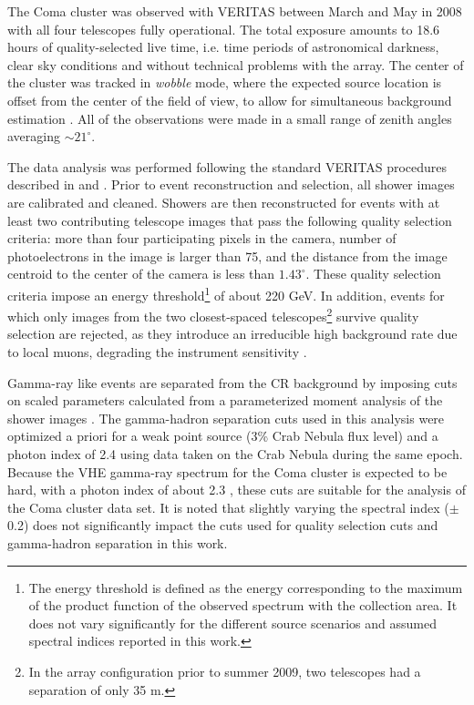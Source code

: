\documentclass[12pt,manuscript]{aastex}
\begin{document}
The Coma cluster was observed with VERITAS between March and May in 2008 with all four telescopes
fully operational. The total exposure amounts to 18.6 hours of quality-selected live time, i.e.
time periods of astronomical darkness, clear sky conditions and without technical problems with the
array. The center of the cluster was tracked in \emph{wobble} mode, where the expected source
location is offset from the center of the field of view, to allow for simultaneous background
estimation \citep{article:Fomin_etal:1994}. All of the observations were made in a small range of
zenith angles averaging $\sim 21^{\circ}$.

The data analysis was performed following the standard VERITAS procedures described in
\citet{inproc:Cogan_etal:2007} and \citet{inproc:Daniel_etal:2007}. Prior to event reconstruction
and selection, all shower images are calibrated and cleaned. Showers are then reconstructed for
events with at least two contributing telescope images that pass the following quality selection
criteria: more than four participating pixels in the camera, number of photoelectrons in the image
is larger than 75, and the distance from the image centroid to the center of the camera is less
than $1.43^{\circ}$. These quality selection criteria impose an energy threshold\footnote{The energy
threshold is defined as the energy corresponding to the maximum of the product function of the
observed spectrum with the collection area. It does not vary significantly for the different source
scenarios and assumed spectral indices reported in this work.} of about 220 GeV. In addition,
events for which only images from the two closest-spaced telescopes\footnote{In the array
configuration prior to summer 2009, two telescopes  had a separation of only 35 m.} survive quality
selection are rejected, as they introduce an irreducible high background rate due to local muons, 
degrading the instrument sensitivity \citep{article:MaierKnapp:2007}.

Gamma-ray like events are separated from the CR background by imposing cuts on scaled parameters
\citep{article:Aharonian_etal:1997, article:Krawczynski_etal:2006} calculated from a parameterized
moment analysis of the shower images \citep{inproc:Hillas:1985}. The gamma-hadron separation cuts
used in this analysis were optimized a priori for a weak point source (3\% Crab Nebula flux level)
and a photon index of 2.4 using data taken on the Crab Nebula during the same epoch. Because the VHE
gamma-ray spectrum for the Coma cluster is expected to be hard, with a photon index of about 2.3
\citep{article:PinzkePfrommer:2010}, these cuts are suitable for the analysis of the Coma cluster
data set. It is noted that slightly varying the spectral index ($\pm$ 0.2) does not significantly
impact the cuts used for quality selection cuts and gamma-hadron separation in this work. 
\end{document}
